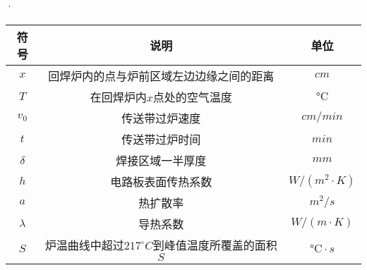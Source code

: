 \documentclass[../main.tex]{subfiles}
\begin{document}
\begin{table}[H]
    \centering·
    \renewcommand{\arrayrulewidth}{2.0pt}
    \begin{tabular}{ccc}
   \hline
    符号 & 说明 & 单位  \\ 
    \hline
      $x$                 & 回焊炉内的点与炉前区域左边边缘之间的距离                   & $ cm$                      \\
    $T$                   & 在回焊炉内$x$点处的空气温度                  &  $°\text{C}$                   \\
    $v_0$                    & 传送带过炉速度          & $cm/min$                      \\
$t$      & 传送带过炉时间                  & $min $                     \\
 $\delta$                      & 焊接区域一半厚度                     & $mm $              \\
 $h$                  & 电路板表面传热系数           & $W/\left( m^2\cdot K \right) $                     \\
$a$             &   热扩散率     & $m^2/s$                     \\
$\lambda$                    & 导热系数        & $W/\left( m\cdot K \right) $                     \\
$S$                   & 炉温曲线中超过$217^{\circ}C$到峰值温度所覆盖的面积$S$                     & $°\text{C}\cdot s$                      \\
   \hline
    \end{tabular}
    \end{table}
\end{document}
